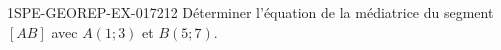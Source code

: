 \begin{exercice}{1SPE-GEOREP-EX-017}{2}{12}
Déterminer l'équation de la médiatrice du segment $[AB]$ avec $A(1 ; 3)$ et $B(5 ; 7)$.
\end{exercice}
